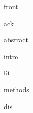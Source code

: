 \documentclass[12pt, twoside]{report}
\begin{document}
{front}

\onehalfspacing

\newpage

{ack}
\newpage

{abstract}


\newpage

\listoffigures
\listoftables

\tableofcontents

\newpage

{intro}
\newpage

{lit}

{methods}

{dis}


\printbibliography
\end{document}
